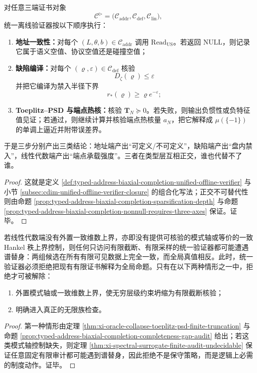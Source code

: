 \begin{proposition}[统一离线验证器的组合规则]\label{prop:typed-address-biaxial-completion-unified-rejection-rule}
对任意三端证书对象
\[
\mathcal C^{\triangleright}
=
\bigl(
\mathcal C_{\mathrm{addr}},
\mathcal C_{\mathrm{def}},
\mathcal C_{\mathrm{lin}}
\bigr),
\]
统一离线验证器按以下顺序执行：
\begin{enumerate}
  \item \textbf{地址一致性：}对每个 \((L,\theta,b)\in\mathcal C_{\mathrm{addr}}\) 调用 \(\mathrm{Read}_{\mathrm{US}}\)。若返回 \(\mathrm{NULL}\)，则记录它属于语义空值、协议空值还是碰撞空值；
  \item \textbf{缺陷编译：}对每个 \((\varrho,\varepsilon)\in\mathcal C_{\mathrm{def}}\) 核验
  \[
  D_{\zeta}(\varrho)\le \varepsilon
  \]
  并把它编译为禁入半径下界
  \[
  r_{\ast}(\varrho)\ge \varrho e^{-\varepsilon};
  \]
  \item \textbf{Toeplitz--PSD 与端点热核：}核验 \(\mathbf{T}_N\succeq 0\)。若失败，则输出负惯性或负特征值见证；若通过，则继续计算并核验端点热核量 \(a_N\)，把它解释成 \(\mu(\{-1\})\) 的单调上逼近并附带误差界。
\end{enumerate}
于是三步分别产出三类结论：地址端产出“可定义/不可定义”，缺陷端产出“盘内禁入”，线性代数端产出“端点承载强度”。三者在类型层互相正交，谁也代替不了谁。
\end{proposition}
\begin{proof}
这就是定义 \ref{def:typed-address-biaxial-completion-unified-offline-verifier} 与小节 \ref{subsec:cdim-unified-offline-verifier-closure} 的组合化写法；正交不可替代性则由命题 \ref{prop:typed-address-biaxial-completion-sparsification-depth} 与命题 \ref{prop:typed-address-biaxial-completion-nonnull-requires-three-axes} 保证。证毕。
\end{proof}

\begin{corollary}[统一拒绝规则]\label{cor:typed-address-biaxial-completion-unified-rejection-rule}
若线性代数端没有外置一致维数上界，亦即没有提供可核验的模式轴或等价的一致 Hankel 秩上界控制，则任何只访问有限截断、有限采样的统一验证器都可能遭遇谱替身：两组候选在所有有限可见数据上完全一致，而全局真值相反。此时，统一验证器必须拒绝把现有有限证书解释为全局命题。只有在以下两种情形之一中，拒绝才可被解除：
\begin{enumerate}
  \item 外置模式轴或一致维数上界，使无穷层级约束坍缩为有限截断核验；
  \item 明确进入真正的无限族检查。
\end{enumerate}
\end{corollary}
\begin{proof}
第一种情形由定理 \ref{thm:xi-oracle-collapse-toeplitz-psd-finite-truncation} 与命题 \ref{prop:typed-address-biaxial-completion-completeness-gap-audit} 给出；若这类模式轴控制缺失，则定理 \ref{thm:xi-spectral-surrogate-finite-audit-undecidable} 保证任意固定有限审计都可能遇到谱替身，因此拒绝不是保守策略，而是逻辑上必需的制度动作。证毕。
\end{proof}

